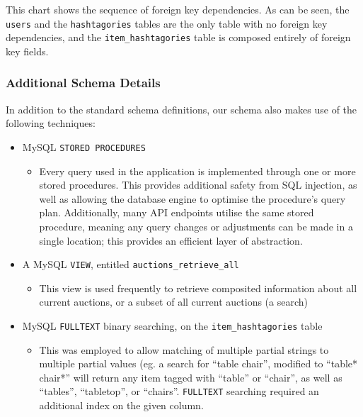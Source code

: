 This chart shows the sequence of foreign key dependencies. As can be
seen, the \texttt{users} and the \texttt{hashtagories} tables are the
only table with no foreign key dependencies, and the
\texttt{item\_hashtagories} table is composed entirely of foreign key
fields.

\subsubsection{Additional Schema
Details}\label{additional-schema-details}

In addition to the standard schema definitions, our schema also makes
use of the following techniques:

\begin{itemize}
\tightlist
\item
  MySQL \texttt{STORED\ PROCEDURES}

  \begin{itemize}
  \tightlist
  \item
    Every query used in the application is implemented through one or
    more stored procedures. This provides additional safety from SQL
    injection, as well as allowing the database engine to optimise the
    procedure's query plan. Additionally, many API endpoints utilise the
    same stored procedure, meaning any query changes or adjustments can
    be made in a single location; this provides an efficient layer of
    abstraction.
  \end{itemize}
\item
  A MySQL \texttt{VIEW}, entitled \texttt{auctions\_retrieve\_all}

  \begin{itemize}
  \tightlist
  \item
    This view is used frequently to retrieve composited information
    about all current auctions, or a subset of all current auctions (a
    search)
  \end{itemize}
\item
  MySQL \texttt{FULLTEXT} binary searching, on the
  \texttt{item\_hashtagories} table

  \begin{itemize}
  \tightlist
  \item
    This was employed to allow matching of multiple partial strings to
    multiple partial values (eg. a search for ``table chair'', modified
    to ``table* chair*'' will return any item tagged with ``table'' or
    ``chair'', as well as ``tables'', ``tabletop'', or ``chairs''.
    \texttt{FULLTEXT} searching required an additional index on the
    given column.
  \end{itemize}
\end{itemize}

